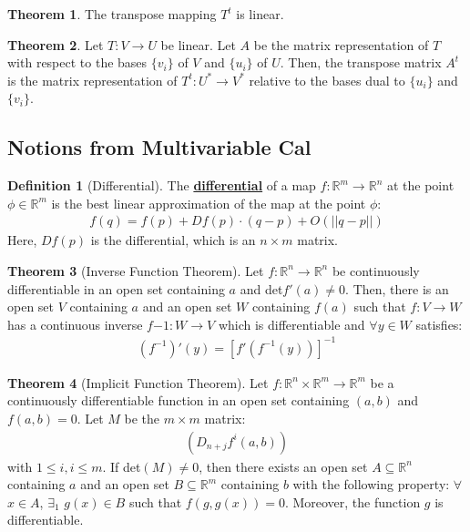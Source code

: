 \documentclass[11pt]{scrartcl}
\newcommand{\R}[0]{\mathbb{R}}
\theoremstyle{definition}
\newtheorem{theorem}{Theorem}
\newtheorem{definition}{Definition}
\theoremstyle{remark}
\newcommand{\dfn}[1]{\textbf{\underline{#1}}}
\begin{document}
{\begin{theorem}
	The transpose mapping $T^t$ is linear. 
\end{theorem}
\begin{theorem}
	Let $T: V \rightarrow U$ be linear. Let $A$ be the matrix representation of $T$ with respect to the bases $\{v_i \}$ of $V$ and $\{ u_i \}$ of $U$. Then, the transpose matrix $A^t$ is the matrix representation of $T^t : U^* \rightarrow V^*$ relative to the bases dual to $\{ u_i \}$ and $\{ v_i \}$. 
\end{theorem}


\subsection{Notions from Multivariable Cal}
\begin{definition}[Differential]
	The \dfn{differential} of a map $f: \R^m \rightarrow \R^n$ at the point $\phi \in \R^m$ is the best linear approximation of the map at the point $\phi$: 
	\begin{align}
		f(q) = f(p) + Df(p) \cdot (q-p) + O(||q-p||) 	
	\end{align}
	Here, $Df(p)$ is the differential, which is an $n \times m$ matrix. 
\end{definition}

\begin{theorem}[Inverse Function Theorem]
	Let $f: \R^n \rightarrow \R^n$ be continuously differentiable in an open set containing $a$ and det$f'(a) \neq 0$. Then, there is an open set $V$ containing $a$ and an open set $W$  containing $f(a)$ such that $f: V \rightarrow W$ has a continuous inverse $f{-1}: W \rightarrow V$ which is differentiable and $\forall y \in W$ satisfies: 
	\begin{align}
		(f^{-1})'(y) = [ f'(f^{-1}(y))]^{-1} 	
	\end{align}
\end{theorem}

\begin{theorem}[Implicit Function Theorem]
	Let $f: \R^n \times \R^m \rightarrow \R^m$ be a continuously differentiable function in an open set containing $(a,b)$ and $f(a,b) =0$. Let $M$ be the $m \times m$ matrix: 
	\begin{align*}
		(D_{n+j}f^i (a,b)) 
	\end{align*}
	with $1 \leq i, i \leq m$. If det$(M) \neq 0 $, then there exists an open set $A \subseteq \R^n$ containing $a$ and an open set $B \subseteq \R^m$ containing $b$ with the following property: $\forall$ $ x \in A$, $\exists_1$ $g(x) \in B$ such that $f(g, g(x) ) =0$. Moreover, the function $g$ is differentiable. 
\end{theorem} 	


}
\end{document}
